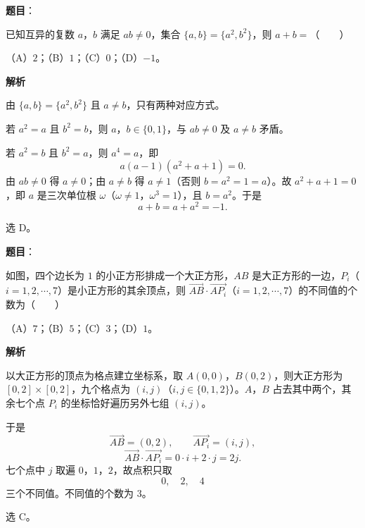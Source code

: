 \begin{answer}

\textbf{题目}：

已知互异的复数 $a$，$b$ 满足 $ab\neq0$，集合 $\{a,b\}=\{a^2,b^2\}$，则 $a+b=$\mbox{（　　）}

（A）$2$；（B）$1$；（C）$0$；（D）$-1$。

\textbf{解析}

由 $\{a,b\}=\{a^2,b^2\}$ 且 $a\neq b$，只有两种对应方式。

若 $a^2=a$ 且 $b^2=b$，则 $a$，$b\in\{0,1\}$，与 $ab\neq0$ 及 $a\neq b$ 矛盾。

若 $a^2=b$ 且 $b^2=a$，则 $a^4=a$，即
\nopagebreak[4]
\[a(a-1)(a^2+a+1)=0 .\]
由 $ab\neq0$ 得 $a\neq0$；由 $a\neq b$ 得 $a\neq1$（否则 $b=a^2=1=a$）。故 $a^2+a+1=0$，即 $a$ 是三次单位根 $\omega$（$\omega\neq1$，$\omega^3=1$），且 $b=a^2$。于是
\nopagebreak[4]
\[a+b=a+a^2=-1 .\]

选 D。


\end{answer}
\begin{answer}

\textbf{题目}：

如图，四个边长为 $1$ 的小正方形排成一个大正方形，$AB$ 是大正方形的一边，$P_i$（$i=1,2,\cdots,7$）是小正方形的其余顶点，则 $\overrightarrow{AB}\cdot\overrightarrow{AP_i}$（$i=1,2,\cdots,7$）的不同值的个数为\mbox{（　　）}
\nopagebreak[4]
\begin{center}\end{center}
\nopagebreak[4]
（A）$7$；（B）$5$；（C）$3$；（D）$1$。

\textbf{解析}

以大正方形的顶点为格点建立坐标系，取 $A(0,0)$，$B(0,2)$，则大正方形为 $[0,2]\times[0,2]$，九个格点为 $(i,j)$（$i,j\in\{0,1,2\}$）。$A$，$B$ 占去其中两个，其余七个点 $P_i$ 的坐标恰好遍历另外七组 $(i,j)$。

于是
\nopagebreak[4]
\[\overrightarrow{AB}=(0,2),\qquad \overrightarrow{AP_i}=(i,j),\]
\nopagebreak[4]
\[\overrightarrow{AB}\cdot\overrightarrow{AP_i}=0\cdot i+2\cdot j=2j .\]
七个点中 $j$ 取遍 $0$，$1$，$2$，故点积只取
\nopagebreak[4]
\[0,\quad2,\quad4\]
三个不同值。不同值的个数为 $3$。

选 C。


\end{answer}
